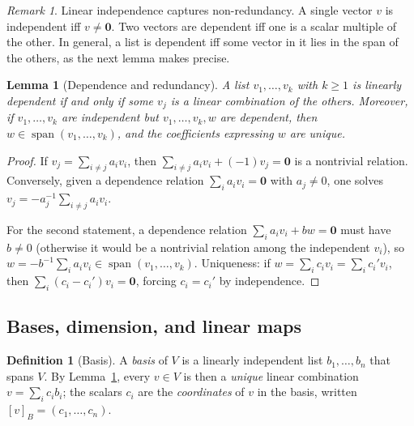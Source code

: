 \documentclass[11pt,a4paper]{article}
\newtheorem{lemma}[theorem]{Lemma}
\theoremstyle{definition}
\newtheorem{definition}[theorem]{Definition}
\theoremstyle{remark}
\newtheorem{remark}[theorem]{Remark}
\begin{document}
\begin{remark}\label{linalg:rem-indep}
Linear independence captures non-redundancy. A single vector \(v\) is independent iff \(v \neq \mathbf 0\). Two vectors are dependent iff one is a scalar multiple of the other. In general, a list is dependent iff some vector in it lies in the span of the others, as the next lemma makes precise.
\end{remark}

\begin{lemma}[Dependence and redundancy]\label{linalg:lem-dependence}
A list \(v_1, \dots, v_k\) with \(k \geq 1\) is linearly dependent if and only if some \(v_j\) is a linear combination of the others. Moreover, if \(v_1, \dots, v_k\) are independent but \(v_1, \dots, v_k, w\) are dependent, then \(w \in \operatorname{span}(v_1, \dots, v_k)\), and the coefficients expressing \(w\) are unique.
\end{lemma}

\begin{proof}
If \(v_j = \sum_{i \neq j} a_i v_i\), then \(\sum_{i\neq j} a_i v_i + (-1) v_j = \mathbf 0\) is a nontrivial relation. Conversely, given a dependence relation \(\sum_i a_i v_i = \mathbf 0\) with \(a_j \neq 0\), one solves \(v_j = -a_j^{-1}\sum_{i \neq j} a_i v_i\).

For the second statement, a dependence relation \(\sum_i a_i v_i + b w = \mathbf 0\) must have \(b \neq 0\) (otherwise it would be a nontrivial relation among the independent \(v_i\)), so \(w = -b^{-1}\sum_i a_i v_i \in \operatorname{span}(v_1,\dots,v_k)\). Uniqueness: if \(w = \sum_i c_i v_i = \sum_i c_i' v_i\), then \(\sum_i (c_i - c_i') v_i = \mathbf 0\), forcing \(c_i = c_i'\) by independence.
\end{proof}

\subsection{Bases, dimension, and linear maps}\label{linalg:subsec-basis}

\begin{definition}[Basis]\label{linalg:def-basis}
A \emph{basis} of \(V\) is a linearly independent list \(b_1, \dots, b_n\) that spans \(V\). By Lemma~\ref{linalg:lem-dependence}, every \(v \in V\) is then a \emph{unique} linear combination \(v = \sum_i c_i b_i\); the scalars \(c_i\) are the \emph{coordinates} of \(v\) in the basis, written \([v]_B = (c_1, \dots, c_n)\).
\end{definition}
\end{document}
